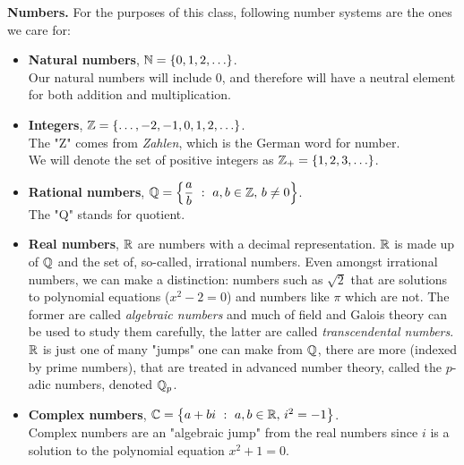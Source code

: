 \vspace*{1em}

{\bf \large Numbers.} For the purposes of this class, following number systems are the ones we care for:
\begin{itemize}
\item \textbf{Natural numbers}, $\mathbb N = \left\{0,1,2,\ldots\right\}$.\\[0.5em]
Our natural numbers will include $0$, and therefore will have a neutral element for both addition and multiplication.
\item \textbf{Integers}, $\mathbb Z = \left\{\ldots,-2,-1,0,1,2,\ldots\right\}$.\\[0.5em]
The "Z" comes from \emph{Zahlen}, which is the German word for number.\\[0.5em]
We will denote the set of positive integers as $\mathbb Z_+ = \left\{1,2,3,\ldots\right\}$.
\item \textbf{Rational numbers}, $\mathbb Q = \left\{\dfrac{a}{b}\ :\ a,b \in \mathbb Z,\,b \neq 0\right\}$.\\[0.5em]
The "Q" stands for quotient.
\item \textbf{Real numbers}, $\mathbb R$ are numbers with a decimal representation. $\mathbb R$ is made up of $\mathbb Q$ and the set of, so-called, irrational numbers. Even amongst irrational numbers, we can make a distinction: numbers such as $\sqrt{2}$ that are solutions to polynomial equations ($x^2 - 2 = 0$) and numbers like $\pi$ which are not. The former are called \emph{algebraic numbers} and much of field and Galois theory can be used to study them carefully, the latter are called \emph{transcendental numbers}.\\[0.5em]
$\mathbb R$ is just one of many "jumps" one can make from $\mathbb Q$, there are more (indexed by prime numbers), that are treated in advanced number theory, called the $p$-adic numbers, denoted $\mathbb Q_p$.
\item \textbf{Complex numbers}, $\mathbb C = \left\{a + bi\ :\ a,b \in \mathbb R,\,i^2 = -1\right\}$.\\[0.5em]
Complex numbers are an "algebraic jump" from the real numbers since $i$ is a solution to the polynomial equation $x^2 + 1 = 0$.
\end{itemize}

\vspace{2em}

